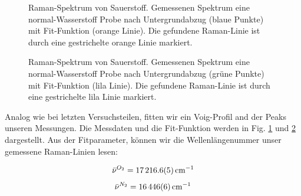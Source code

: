 \documentclass[11 pt]{article}
\begin{document}
\begin{figure}[htbp]
	\centering
   \caption{\small Raman-Spektrum von Sauerstoff. Gemessenen Spektrum eine normal-Wasserstoff Probe nach Untergrundabzug (blaue Punkte) mit Fit-Funktion (orange Linie). Die gefundene Raman-Linie ist durch eine gestrichelte orange Linie markiert.}
   \label{fig:O2}
\end{figure}


\begin{figure}[htbp]
	\centering
   \caption{\small Raman-Spektrum von Sauerstoff. Gemessenen Spektrum eine normal-Wasserstoff Probe nach Untergrundabzug (grüne Punkte) mit Fit-Funktion (lila Linie). Die gefundene Raman-Linie ist durch eine gestrichelte lila Linie markiert.}
   \label{fig:N2}
\end{figure}

Analog wie bei letzten Versuchsteilen, fitten wir ein Voig-Profil and der Peaks unseren Messungen. Die Messdaten und die Fit-Funktion werden in Fig. \ref{fig:O2} und \ref{fig:N2} dargestellt. Aus der Fitparameter, können wir die Wellenlängenummer unser gemessene Raman-Linien lesen:

$$\bar{\nu}^{O_2} = \SI{17216.6\pm 0.5}{cm^{-1}}$$
$$\bar{\nu}^{N_2} = \SI{16446\pm 6}{cm^{-1}}$$
\end{document}
